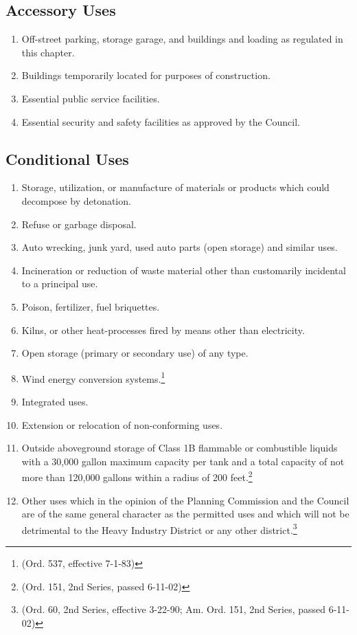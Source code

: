 \subsection{Accessory Uses}
\begin{enumerate}[{\indent}1)]
    \item Off-street parking, storage garage, and buildings and loading as regulated in this chapter.
    \item Buildings temporarily located for purposes of construction.
    \item Essential public service facilities.
    \item Essential security and safety facilities as approved by the Council.
\end{enumerate}
\subsection{Conditional Uses}
\begin{enumerate}[{\indent}1)]
    \item Storage, utilization, or manufacture of materials or products which could decompose by detonation.
    \item Refuse or garbage disposal.
    \item Auto wrecking, junk yard, used auto parts (open storage) and similar uses.
    \item Incineration or reduction of waste material other than customarily incidental to a principal use.
    \item Poison, fertilizer, fuel briquettes.
    \item Kilns, or other heat-processes fired by means other than electricity.
    \item Open storage (primary or secondary use) of any type.
    \item Wind energy conversion systems.\footnote{(Ord. 537, effective 7-1-83)}
    \item Integrated uses.
    \item Extension or relocation of non-conforming uses.
    \item Outside aboveground storage of Class 1B flammable or combustible liquids with a 30,000 gallon maximum capacity per tank and a total capacity of not more than 120,000 gallons within a radius of 200 feet.\footnote{(Ord. 151, 2nd Series, passed 6-11-02)}
    \item Other uses which in the opinion of the Planning Commission and the Council are of the same general character as the permitted uses and which will not be detrimental to the Heavy Industry District or any other district.\footnote{(Ord. 60, 2nd Series, effective 3-22-90; Am. Ord. 151, 2nd Series, passed 6-11-02)}
\end{enumerate}
